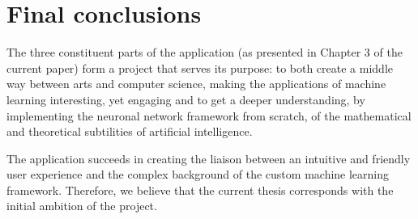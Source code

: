 \chapter*{Final conclusions}
The three constituent parts of the application (as presented in Chapter 3 of the current paper) form a project that serves its purpose: to both create a middle way between arts and computer science, making the applications of machine learning interesting, yet engaging and to get  a deeper understanding, by implementing the neuronal network framework from scratch, of the mathematical and theoretical subtilities of artificial intelligence.

		The application succeeds in creating the liaison between an intuitive and friendly user experience and the complex background of the custom machine learning framework. Therefore, we believe that the current thesis corresponds with the initial ambition of the project.
